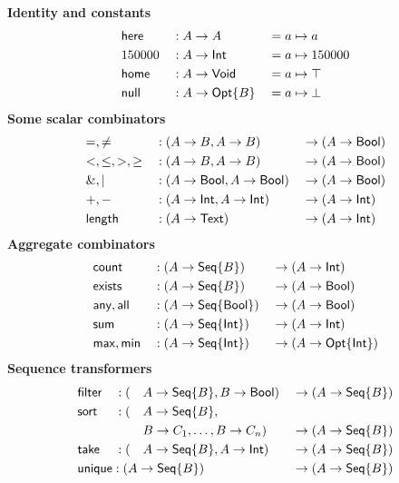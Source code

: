 
\providecommand{\bigtablesize}{\relax}
\begin{table}
    \begin{framed}
    \bigtablesize
    \textbf{Identity and constants}
    \begin{alignat*}{3}
        & \mathsf{here} && : A \to A && = a \mapsto a \\
        & 150000 && : A \to \mathsf{Int} && = a \mapsto 150000 \\
        & \mathsf{home} && : A \to \mathsf{Void} && = a \mapsto \top \\
        & \mathsf{null} && : A \to \mathsf{Opt}{\left\{B\right\}} && = a \mapsto \bot
    \end{alignat*}
    \textbf{Some scalar combinators}
    \begin{alignat*}{3}
        & {=},{\ne} && : (A \to B, A \to B) && \to (A \to \mathsf{Bool}) \\
        & {<},{\le},{>},{\ge} && : (A \to B, A \to B) && \to (A \to \mathsf{Bool}) \\
        & {\&},{|} && : (A \to \mathsf{Bool}, A \to \mathsf{Bool}) && \to (A \to \mathsf{Bool}) \\
        & {+},{-} && : (A \to \mathsf{Int}, A \to \mathsf{Int}) && \to (A \to \mathsf{Int}) \\
        & \mathsf{length} && : (A \to \mathsf{Text}) && \to (A \to \mathsf{Int})
    \end{alignat*}
    \textbf{Aggregate combinators}
    \begin{alignat*}{3}
        & \mathsf{count} && : (A \to \mathsf{Seq}{\left\{B\right\}}) && \to (A \to \mathsf{Int}) \\
        & \mathsf{exists} && : (A \to \mathsf{Seq}{\left\{B\right\}}) && \to (A \to \mathsf{Bool}) \\
        & \mathsf{any}, \mathsf{all} && : (A \to \mathsf{Seq}{\left\{\mathsf{Bool}\right\}}) && \to (A \to \mathsf{Bool}) \\
        & \mathsf{sum} && : (A \to \mathsf{Seq}{\left\{\mathsf{Int}\right\}}) && \to (A \to \mathsf{Int}) \\
        & \mathsf{max}, \mathsf{min} && : (A \to \mathsf{Seq}{\left\{\mathsf{Int}\right\}}) && \to (A \to \mathsf{Opt}{\left\{\mathsf{Int}\right\}})
    \end{alignat*}
    \textbf{Sequence transformers}
    \begin{alignat*}{4}
        & \Filter && : (&& A \to \Seq{B}, B \to \Bool) && \to (A \to \Seq{B}) \\
        & \Sort && : (&& A \to \Seq{B}, && \\
        & && && B \to C_1, \ldots, B \to C_n) && \to (A \to \Seq{B}) \\
        & \Take && : (&& A \to \Seq{B}, A \to \Int) && \to (A \to \Seq{B}) \\
        & \Unique : (A \to \Seq{B})\hidewidth && && && \to (A \to \Seq{B})
    \end{alignat*}

\end{framed}
\end{table}

